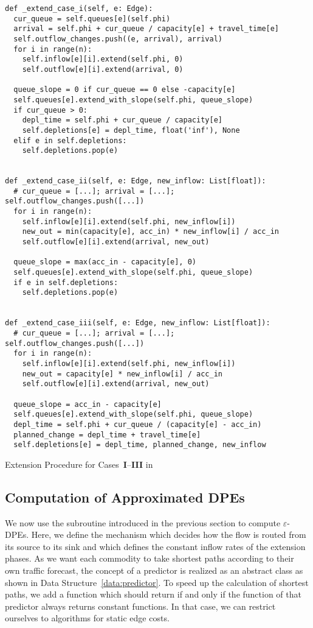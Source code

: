 \begin{algorithm}
    \begin{verbatim}
def _extend_case_i(self, e: Edge):
  cur_queue = self.queues[e](self.phi)
  arrival = self.phi + cur_queue / capacity[e] + travel_time[e]
  self.outflow_changes.push((e, arrival), arrival)
  for i in range(n):
    self.inflow[e][i].extend(self.phi, 0)
    self.outflow[e][i].extend(arrival, 0)

  queue_slope = 0 if cur_queue == 0 else -capacity[e]
  self.queues[e].extend_with_slope(self.phi, queue_slope)
  if cur_queue > 0:
    depl_time = self.phi + cur_queue / capacity[e]
    self.depletions[e] = depl_time, float('inf'), None
  elif e in self.depletions:
    self.depletions.pop(e)


def _extend_case_ii(self, e: Edge, new_inflow: List[float]):
  # cur_queue = [...]; arrival = [...]; self.outflow_changes.push([...])
  for i in range(n):
    self.inflow[e][i].extend(self.phi, new_inflow[i])
    new_out = min(capacity[e], acc_in) * new_inflow[i] / acc_in
    self.outflow[e][i].extend(arrival, new_out)

  queue_slope = max(acc_in - capacity[e], 0)
  self.queues[e].extend_with_slope(self.phi, queue_slope)
  if e in self.depletions:
    self.depletions.pop(e)


def _extend_case_iii(self, e: Edge, new_inflow: List[float]):
  # cur_queue = [...]; arrival = [...]; self.outflow_changes.push([...])
  for i in range(n):
    self.inflow[e][i].extend(self.phi, new_inflow[i])
    new_out = capacity[e] * new_inflow[i] / acc_in
    self.outflow[e][i].extend(arrival, new_out)

  queue_slope = acc_in - capacity[e]
  self.queues[e].extend_with_slope(self.phi, queue_slope)
  depl_time = self.phi + cur_queue / (capacity[e] - acc_in)
  planned_change = depl_time + travel_time[e]
  self.depletions[e] = depl_time, planned_change, new_inflow
\end{verbatim}
\caption{Extension Procedure for Cases~\textbf{I}--\textbf{III} in }
\label{alg:extend-cases}
\end{algorithm}


\subsection{Computation of Approximated DPEs}

We now use the subroutine introduced in the previous section to compute $\varepsilon$-DPEs.
Here, we define the mechanism which decides how the flow is routed from its source to its sink and which defines the constant inflow rates of the extension phases.
As we want each commodity to take shortest paths according to their own traffic forecast, the concept of a predictor is realized as an abstract class as shown in Data Structure~\ref{data:predictor}.
To speed up the calculation of shortest paths, we add a function  which should return  if and only if the  function of that predictor always returns constant functions.
In that case, we can restrict ourselves to algorithms for static edge costs.

